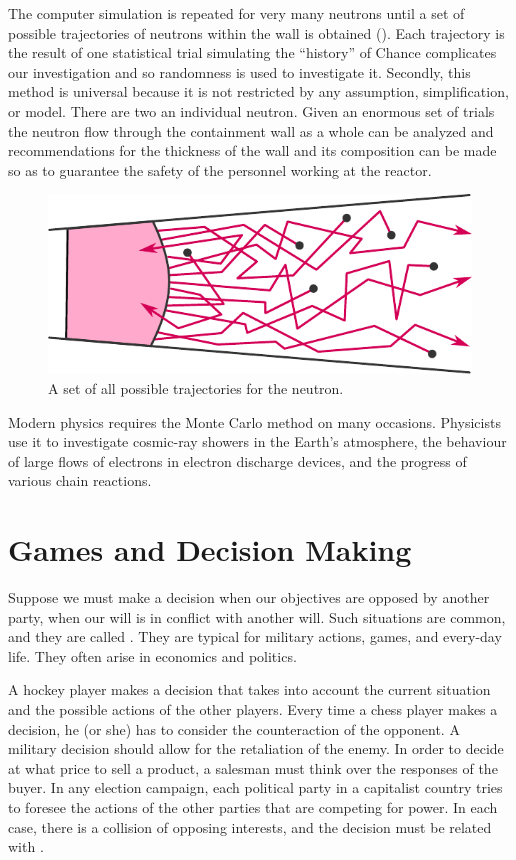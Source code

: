 The computer simulation is repeated for very many neutrons until a set of possible
trajectories of neutrons within the wall is obtained (). Each trajectory is the result of one statistical trial simulating the ``history'' of
Chance complicates our investigation and so randomness is used to
investigate it. Secondly, this method is universal because it is not
restricted by any assumption, simplification, or model. There are two
an individual neutron. Given an enormous set of trials the neutron flow
through the containment wall as a whole can be analyzed and
recommendations for the thickness of the wall and its composition can
be made so as to guarantee the safety of the personnel working at the
reactor.
 \begin{figure}[!h]
 \centering
 \includegraphics[width=0.85\tfwidth]{figures/neutron-path.pdf}
\caption{A set of all possible trajectories for the neutron.\label{neutron-path}}
 \end{figure}

Modern physics requires the Monte Carlo method on many
occasions. Physicists use it to investigate cosmic-ray showers in the
Earth's atmosphere, the behaviour of large flows of electrons in electron
discharge devices, and the progress of various chain reactions.

\section{Games and Decision Making}

 Suppose we must make a decision when
our objectives are opposed by another party, when our will is in conflict
with another will. Such situations are common, and they are called
. They are typical for military actions, games, and
every-day life. They often arise in economics and politics.

A hockey player makes a decision that takes into account the current
situation and the possible actions of the other players. Every time
a chess player makes a decision, he (or she) has to consider the
counteraction of the opponent. A military decision should allow for the
retaliation of the enemy. In order to decide at what price to sell
a product, a salesman must think over the responses of the buyer. In
any election campaign, each political party in a capitalist country tries
to foresee the actions of the other parties that are competing for power.
In each case, there is a collision of opposing interests, and the decision
must be related with .

